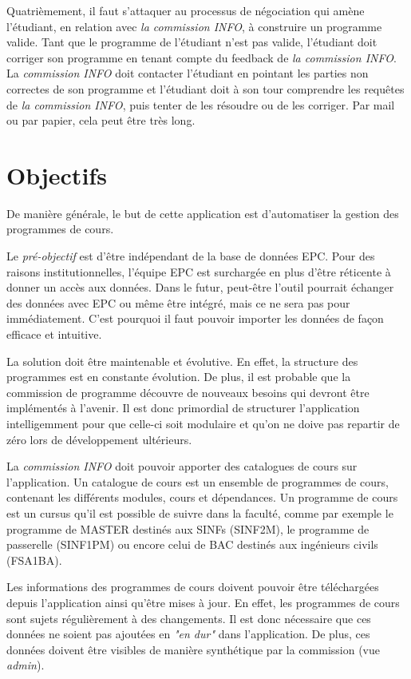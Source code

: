Quatrièmement, il faut s'attaquer au processus de négociation qui amène l'étudiant, en relation avec \textit{la commission INFO}, à construire un programme valide. Tant que le programme de l'étudiant n'est pas valide, l'étudiant doit corriger son programme en tenant compte du feedback de \textit{la commission INFO}. La \textit{commission INFO} doit contacter l'étudiant en pointant les parties non correctes de son programme et l'étudiant doit à son tour comprendre les requêtes de \textit{la commission INFO}, puis tenter de les résoudre ou de les corriger. Par mail ou par papier, cela peut être très long. 
\clearpage


\section{Objectifs}
De manière générale, le but de cette application est d'automatiser la gestion des programmes de cours. 


Le \textit{pré-objectif} est d'être indépendant de la base de données EPC. Pour des raisons institutionnelles, l'équipe EPC est surchargée en plus d'être réticente à donner un accès aux données. Dans le futur, peut-être l'outil pourrait échanger des données avec EPC ou même être intégré, mais ce ne sera pas pour immédiatement. C'est pourquoi il faut pouvoir importer les données de façon efficace et intuitive.
 
La solution doit être maintenable et évolutive. En effet, la structure des programmes est en constante évolution. De plus, il est probable que la commission de programme découvre de nouveaux besoins qui devront être implémentés à l'avenir. Il est donc primordial de structurer l'application intelligemment pour que celle-ci soit modulaire et qu'on ne doive pas repartir de zéro lors de développement ultérieurs.

La \textit{commission INFO} doit pouvoir apporter des catalogues de cours sur l'application. Un catalogue de cours est un ensemble de programmes de cours, contenant les différents modules, cours et dépendances. Un programme de cours est un cursus qu'il est possible de suivre dans la faculté, comme par exemple le programme de MASTER destinés aux SINFs (SINF2M), le programme de passerelle (SINF1PM) ou encore celui de BAC destinés aux ingénieurs civils (FSA1BA).  

Les informations des programmes de cours  doivent pouvoir être téléchargées depuis l'application ainsi qu'être mises à jour. En effet, les programmes de cours sont sujets régulièrement à des changements. Il est donc nécessaire que ces données ne soient pas ajoutées en \textit{"en dur"} dans l'application. De plus, ces données doivent être visibles de manière synthétique par la commission (vue \textit{admin}).

